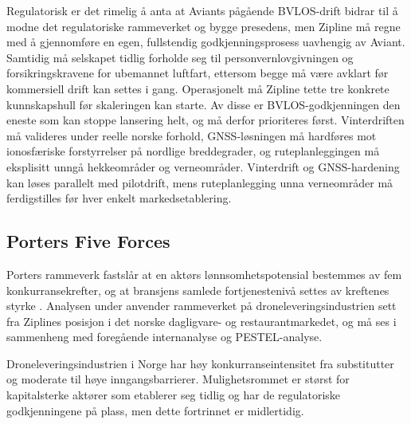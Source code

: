 Regulatorisk er det rimelig å anta at Aviants pågående BVLOS-drift bidrar
til å modne det regulatoriske rammeverket og bygge presedens, men Zipline må
regne med å gjennomføre en egen, fullstendig godkjenningsprosess uavhengig
av Aviant. Samtidig må selskapet tidlig forholde seg til
personvernlovgivningen og forsikringskravene for ubemannet luftfart,
ettersom begge må være avklart før kommersiell drift kan settes i gang.
Operasjonelt må Zipline tette tre konkrete kunnskapshull før skaleringen
kan starte. Av disse er BVLOS-godkjenningen den eneste som kan stoppe
lansering helt, og må derfor prioriteres først. Vinterdriften må valideres
under reelle norske forhold, GNSS-løsningen må hardføres mot ionosfæriske
forstyrrelser på nordlige breddegrader, og ruteplanleggingen må eksplisitt
unngå hekkeområder og verneområder. Vinterdrift og GNSS-hardening kan løses
parallelt med pilotdrift, mens ruteplanlegging unna verneområder må
ferdigstilles før hver enkelt markedsetablering.

\subsection{Porters Five Forces}

Porters rammeverk fastslår at en aktørs lønnsomhetspotensial bestemmes av fem
konkurransekrefter, og at bransjens samlede fortjenestenivå settes av
kreftenes styrke \parencite[35]{porter1980}. Analysen under anvender
rammeverket på droneleveringsindustrien sett fra Ziplines posisjon i det
norske dagligvare- og restaurantmarkedet, og må ses i sammenheng med
foregående internanalyse og PESTEL-analyse.

Droneleveringsindustrien i Norge har høy konkurranseintensitet fra
substitutter og moderate til høye inngangsbarrierer. Mulighetsrommet er størst
for kapitalsterke aktører som etablerer seg tidlig og har de regulatoriske
godkjenningene på plass, men dette fortrinnet er midlertidig.

